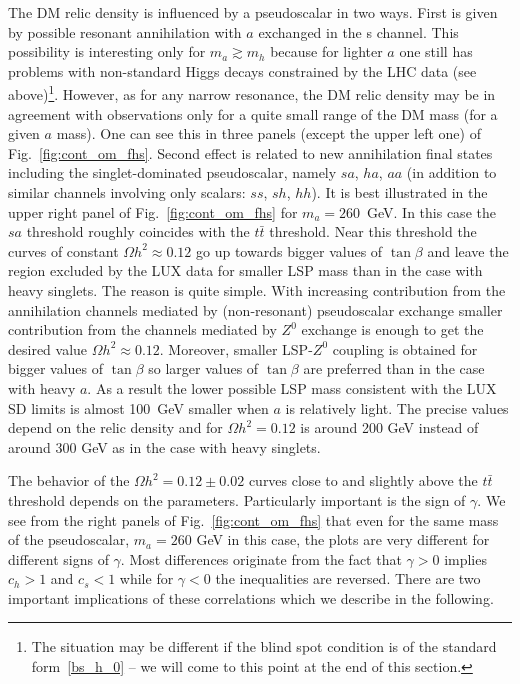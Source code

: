 \documentclass[12pt,twoside]{article}
\begin{document}
The DM relic density is influenced by a pseudoscalar in two ways. 
First is given by possible resonant annihilation with $a$ exchanged in the 
s channel. This possibility is interesting only for $m_a\gtrsim m_h$ 
because for lighter $a$ one still has problems with non-standard Higgs decays
constrained by the LHC data 
(see above)\footnote{
The situation may be different if the blind spot condition is of the standard 
form~\eqref{bs_h_0} -- we will come to this point at the end of this 
section.}.
However, as for any narrow resonance, the DM relic density may be in agreement 
with observations only for a quite small range of the DM mass (for 
a given $a$ mass). One can see this in three panels (except the upper left one) 
of Fig.~\ref{fig:cont_om_fhs}. 
Second effect is related to new annihilation final states including 
the singlet-dominated pseudoscalar, namely $sa$, $ha$, $aa$
(in addition to similar channels involving only scalars: $ss$, $sh$, $hh$). 
It is best illustrated in the upper right panel of Fig.~\ref{fig:cont_om_fhs} 
for $m_a=260$~GeV. In this case the $sa$ threshold roughly coincides with 
the $t\bar{t}$ threshold. Near this threshold the curves of constant 
$\Omega h^2\approx0.12$ go up towards bigger values of $\tan\beta$ and 
leave the region excluded by the LUX data for smaller LSP mass 
than in the case with heavy singlets. The reason is quite simple. 
With increasing contribution from the annihilation channels mediated by 
(non-resonant) pseudoscalar exchange smaller contribution from the 
channels mediated by $Z^0$ exchange is enough to get the desired value 
$\Omega h^2\approx0.12$. Moreover, smaller LSP-$Z^0$ coupling is obtained 
for bigger values of $\tan\beta$ so larger values of $\tan\beta$ are 
preferred than in the case with heavy $a$.
As a result the lower possible LSP mass consistent with the LUX SD limits 
is almost 100~GeV smaller when $a$ is relatively light. The precise values 
depend on the relic density and for $\Omega h^2=0.12$ is around 200 GeV 
instead of around 300 GeV as in the case with heavy singlets. 


The behavior of the $\Omega h^2=0.12\pm0.02$ curves close to and 
slightly above the $t\bar{t}$ threshold depends on the parameters. 
Particularly important is the sign of $\gamma$. We see from the right
panels of Fig.~\ref{fig:cont_om_fhs} that even for the same mass of the 
pseudoscalar, $m_a=260$ GeV in this case, the plots are very different for
different signs of $\gamma$. Most differences originate from the fact 
that $\gamma>0$ implies $c_h>1$ and $c_s<1$ while for $\gamma<0$ the
inequalities are reversed. There are two important implications of these 
correlations which we describe in the following.
\end{document}
